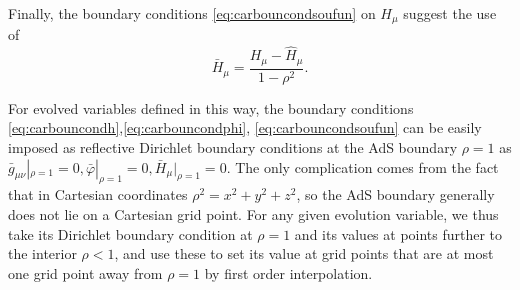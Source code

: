 \documentclass[a4paper,11pt]{article}
\numberwithin{equation}{section}
\begin{document}
Finally, the boundary conditions \eqref{eq:carbouncondsoufun} on $H_\mu$ suggest the use of
\begin{equation}\label{eq:soufunb}
\bar{H}_\mu=\frac{H_\mu-\hat{H}_\mu}{1-\rho^2 }.
\end{equation}


For evolved variables defined in this way, the boundary conditions \eqref{eq:carbouncondh},\eqref{eq:carbouncondphi}, \eqref{eq:carbouncondsoufun} can be easily imposed as reflective Dirichlet boundary conditions at the AdS boundary $\rho=1$ as $\bar{g}_{\mu\nu}|_{\rho=1}=0,\bar{\varphi}|_{\rho=1}=0,\bar{H}_\mu|_{\rho=1}=0$.
The only complication comes from the fact that in Cartesian coordinates $\rho^2=x^2+y^2+z^2$, so the AdS boundary generally does not lie on a Cartesian grid point. 
For any given evolution variable, we thus take its Dirichlet boundary condition at $\rho=1$ and its values at points further to the interior $\rho<1$, and use these to set its value at grid points that are at most one grid point away from $\rho=1$ by first order interpolation.
\end{document}
